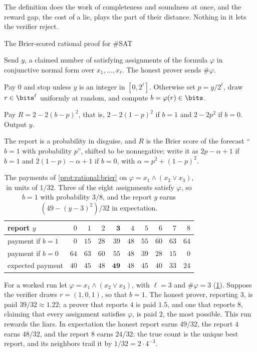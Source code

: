 \begin{refsection}
The definition does the work of completeness and soundness at once, and the reward gap, the cost of a lie, plays the part of their distance. Nothing in it lets the verifier reject.

\begin{protocol}{The Brier-scored rational proof for \#SAT}\label{prot:rational:brier}
\item[\msg{P}{V}] Send $y$, a claimed number of satisfying assignments of the formula $\varphi$ in conjunctive normal form over $x_1,\dots,x_\ell$. The honest prover sends $\#\varphi$.
\item[\act{V}] Pay $0$ and stop unless $y$ is an integer in $[0,2^\ell]$. Otherwise set $p=y/2^\ell$, draw $r\in\bits^\ell$ uniformly at random, and compute $b=\varphi(r)\in\bits$.
\item[\msg{V}{P}] Pay $R=2-2(b-p)^2$, that is, $2-2(1-p)^2$ if $b=1$ and $2-2p^2$ if $b=0$. Output $y$.
\end{protocol}

The report is a probability in disguise, and $R$ is the Brier score of the forecast ``$b=1$ with probability $p$'', shifted to be nonnegative; \textcite{AzarMicali2012} write it as $2p-\alpha+1$ if $b=1$ and $2(1-p)-\alpha+1$ if $b=0$, with $\alpha=p^2+(1-p)^2$.

\begin{table}[t]
\centering\small
\begin{tabular}{@{}l*{9}{r}@{}}
\toprule
report $y$ & $0$ & $1$ & $2$ & $\mathbf{3}$ & $4$ & $5$ & $6$ & $7$ & $8$\\
\midrule
payment if $b=1$ & $0$ & $15$ & $28$ & $39$ & $48$ & $55$ & $60$ & $63$ & $64$\\
payment if $b=0$ & $64$ & $63$ & $60$ & $55$ & $48$ & $39$ & $28$ & $15$ & $0$\\
expected payment & $40$ & $45$ & $48$ & $\mathbf{49}$ & $48$ & $45$ & $40$ & $33$ & $24$\\
\bottomrule
\end{tabular}
\caption{The payments of \cref{prot:rational:brier} on $\varphi=x_1\wedge(x_2\vee x_3)$, in units of $1/32$. Three of the eight assignments satisfy $\varphi$, so $b=1$ with probability $3/8$, and the report $y$ earns $(49-(y-3)^2)/32$ in expectation.}\label{tab:rational:run}
\end{table}

For a worked run let $\varphi=x_1\wedge(x_2\vee x_3)$, with $\ell=3$ and $\#\varphi=3$ (\cref{tab:rational:run}). Suppose the verifier draws $r=(1,0,1)$, so that $b=1$. The honest prover, reporting $3$, is paid $39/32\approx1.22$; a prover that reports $4$ is paid $1.5$, and one that reports $8$, claiming that every assignment satisfies $\varphi$, is paid $2$, the most possible. This run rewards the liars. In expectation the honest report earns $49/32$, the report $4$ earns $48/32$, and the report $8$ earns $24/32$: the true count is the unique best report, and its neighbors trail it by $1/32=2\cdot4^{-3}$.


\end{refsection}
